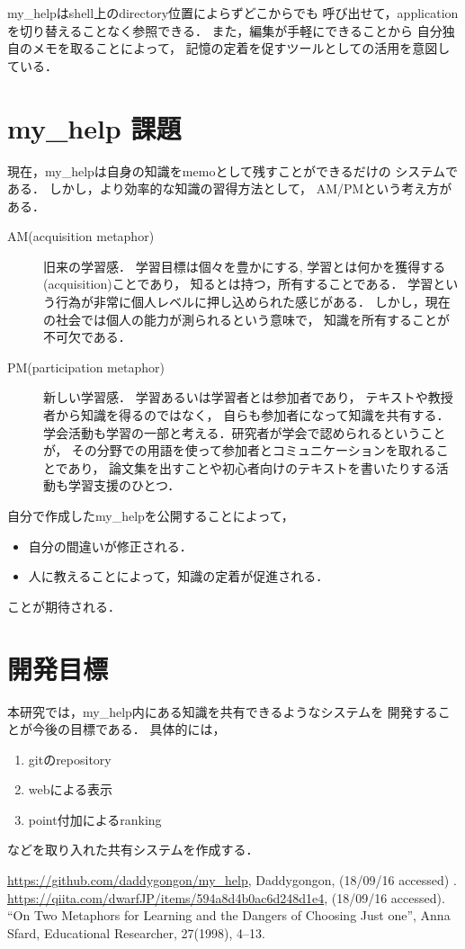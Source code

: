 \documentclass[a4j,twocolumn,uplatex]{jsarticle}
\begin{document}
my\_helpはshell上のdirectory位置によらずどこからでも
呼び出せて，applicationを切り替えることなく参照できる．
また，編集が手軽にできることから
自分独自のメモを取ることによって，
記憶の定着を促すツールとしての活用を意図している．

\section{my\_help 課題}
\label{sec-3}
現在，my\_helpは自身の知識をmemoとして残すことができるだけの
システムである．
しかし，より効率的な知識の習得方法として，
AM/PMという考え方がある\cite{sfard}．

\begin{description}
\item[AM(acquisition metaphor)] 旧来の学習感．
学習目標は個々を豊かにする, 学習とは何かを獲得する(acquisition)ことであり，
知るとは持つ，所有することである．
学習という行為が非常に個人レベルに押し込められた感じがある．
しかし，現在の社会では個人の能力が測られるという意味で，
知識を所有することが不可欠である．
\item[PM(participation metaphor)] 新しい学習感．
学習あるいは学習者とは参加者であり，
テキストや教授者から知識を得るのではなく，
自らも参加者になって知識を共有する．
学会活動も学習の一部と考える．研究者が学会で認められるということが，
その分野での用語を使って参加者とコミュニケーションを取れることであり，
論文集を出すことや初心者向けのテキストを書いたりする活動も学習支援のひとつ．
\end{description}

自分で作成したmy\_helpを公開することによって，
\begin{itemize}
\item 自分の間違いが修正される．
\item 人に教えることによって，知識の定着が促進される．
\end{itemize}
ことが期待される．

\section{開発目標}
本研究では，my\_help内にある知識を共有できるようなシステムを
開発することが今後の目標である．
具体的には，
\begin{enumerate}
\item gitのrepository
\item webによる表示
\item point付加によるranking
\end{enumerate}
などを取り入れた共有システムを作成する．

{\small\setlength\baselineskip{10pt}	%
\begin{thebibliography}{9}
\url{https://github.com/daddygongon/my_help}, Daddygongon, (18/09/16 accessed) .
 \url{https://qiita.com/dwarfJP/items/594a8d4b0ac6d248d1e4}, (18/09/16 accessed).
“On Two Metaphors for Learning and the Dangers of Choosing Just one”, Anna
Sfard, Educational Researcher, 27(1998), 4–13.
\end{thebibliography}
}
\end{document}
